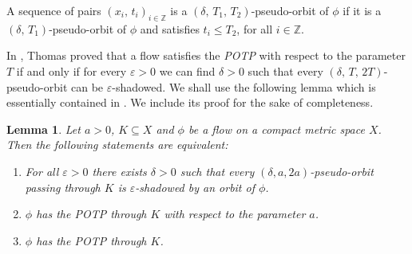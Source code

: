\documentclass{amsart}
\newtheorem{lemma}[theorem]{Lemma}
\theoremstyle{definition}
\newcommand{\ep}{\varepsilon}
\begin{document}
A sequence of pairs $(x_i,\, t_i)_{i\in \mathbb{Z}}$ is a $(\delta,\,T_1,\,T_2)$-pseudo-orbit of $\phi$ if it is a $(\delta,\,T_1)$-pseudo-orbit of $\phi$ and satisfies $t_i \leq T_2$, for all $i\in\mathbb{Z}$. 

In \cite{Thomas84}, Thomas proved that a flow satisfies the {\em POTP} with respect to the parameter $T$ if and only if for every $\ep > 0$ we can find $\delta > 0$ such that every $(\delta,\,T,\, 2T)$-pseudo-orbit can be $\ep$-shadowed. We shall use the following lemma which is essentially contained in \cite{Thomas84}. We include its proof for the sake of completeness.

\begin{lemma}\label{lemma2}
Let $a>0$, $K\subseteq X$ and $\phi$ be a flow on a compact metric space $X$. Then the following statements are equivalent:
\begin{enumerate}[(1)]
\item For all $\ep>0$ there exists $\delta>0$ such that every $(\delta,a,2a)$-pseudo-orbit passing through $K$ is $\ep$-shadowed by an orbit of $\phi$.
\item $\phi$ has the POTP through $K$ with respect to the parameter $a$.
\item $\phi$ has the POTP through $K$.
\end{enumerate}
\end{lemma}
\end{document}

